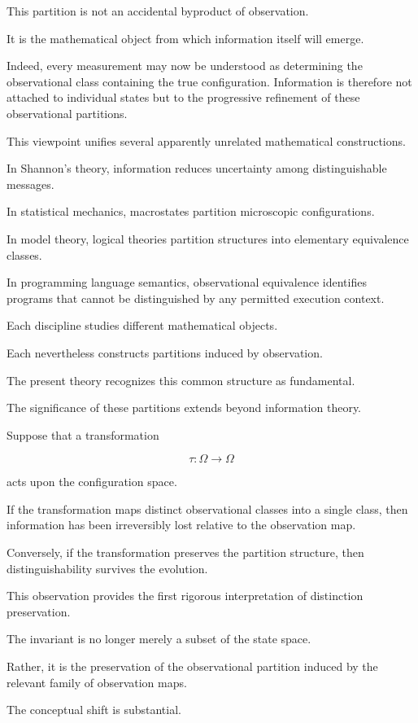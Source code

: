 \documentclass[11pt]{book}
\numberwithin{equation}{chapter}
\theoremstyle{definition}
\theoremstyle{plain}
\begin{document}
This partition is not an accidental byproduct of observation.

It is the mathematical object from which information itself will emerge.

Indeed, every measurement may now be understood as determining the observational class containing the true configuration. Information is therefore not attached to individual states but to the progressive refinement of these observational partitions.

This viewpoint unifies several apparently unrelated mathematical constructions.

In Shannon's theory, information reduces uncertainty among distinguishable messages.

In statistical mechanics, macrostates partition microscopic configurations.

In model theory, logical theories partition structures into elementary equivalence classes.

In programming language semantics, observational equivalence identifies programs that cannot be distinguished by any permitted execution context.

Each discipline studies different mathematical objects.

Each nevertheless constructs partitions induced by observation.

The present theory recognizes this common structure as fundamental.

The significance of these partitions extends beyond information theory.

Suppose that a transformation

\[
\tau:\Omega\rightarrow\Omega
\]

acts upon the configuration space.

If the transformation maps distinct observational classes into a single class, then information has been irreversibly lost relative to the observation map.

Conversely, if the transformation preserves the partition structure, then distinguishability survives the evolution.

This observation provides the first rigorous interpretation of distinction preservation.

The invariant is no longer merely a subset of the state space.

Rather, it is the preservation of the observational partition induced by the relevant family of observation maps.

The conceptual shift is substantial.
\end{document}
